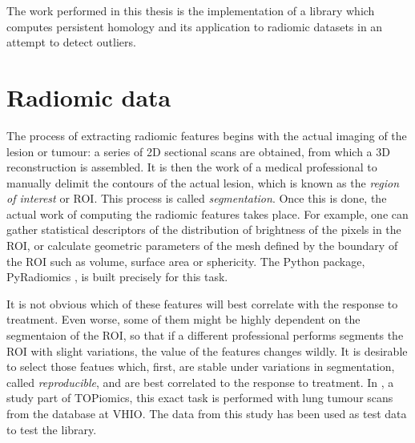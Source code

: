 \documentclass[../main.tex]{subfiles}
\begin{document}
The work performed in this thesis is the implementation of a library which computes
persistent homology and its application to radiomic datasets in an attempt to detect
outliers. 

\section{Radiomic data}
The process of extracting radiomic features begins with the actual imaging of the lesion
or tumour: a series of 2D sectional scans are obtained, from which a 3D reconstruction is
assembled. It is then the work of a medical professional to manually delimit the contours
of the actual lesion, which is known as the \emph{region of interest} or ROI. This process is
called \emph{segmentation}. Once this is done, the actual work of computing the radiomic
features takes place. For example, one can gather statistical descriptors of the
distribution of brightness of the pixels in the ROI, or calculate geometric parameters of
the mesh defined by the boundary of the ROI such as volume, surface area or sphericity.
The Python package, \textsf{PyRadiomics} \cite{pyradiomics}, is built precisely for this
task. 

It is not obvious which of these features will best correlate with the response to
treatment. Even worse, some of them might be highly dependent on the segmentaion of the
ROI, so that if a different professional performs segments the ROI with slight variations,
the value of the features changes wildly. It is desirable to select those featues which,
first, are stable under variations in segmentation, called \emph{reproducible}, and are
best correlated to the response to treatment. In \cite{features}, a study part of
TOPiomics, this exact task is performed with lung tumour scans from the database at VHIO.
The data from this study has been used as test data to test the library.
\end{document}
